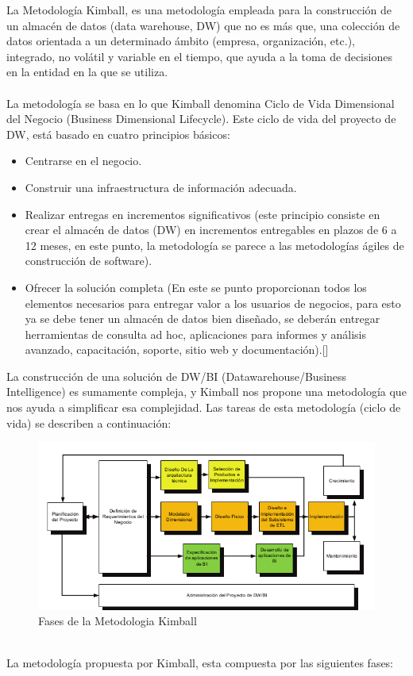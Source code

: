 \documentclass[11pt,a4paper]{article}
\begin{document}
		La Metodología Kimball, es una metodología empleada para la construcción de un almacén de datos (data warehouse, DW) que no es más que, una colección de datos orientada a un determinado ámbito (empresa, organización, etc.), integrado, no volátil y variable en el tiempo, que ayuda a la toma de decisiones en la entidad en la que se utiliza.\\
		\\
		La metodología se basa en lo que Kimball denomina Ciclo de Vida Dimensional del Negocio (Business Dimensional Lifecycle). Este ciclo de vida del proyecto de DW, está basado en cuatro principios básicos:
		\begin{itemize}
			\item Centrarse en el negocio.
			
			\item Construir una infraestructura de información adecuada.
			
			\item Realizar entregas en incrementos significativos (este principio consiste en crear el almacén de datos (DW) en incrementos entregables en plazos de 6 a 12 meses, en este punto, la metodología se parece a las metodologías ágiles de construcción de software).
			
			\item Ofrecer la solución completa (En este se punto proporcionan todos los elementos necesarios para entregar valor a los usuarios de negocios, para esto ya se debe tener un almacén de datos bien diseñado, se deberán entregar herramientas de consulta ad hoc, aplicaciones para informes y análisis avanzado, capacitación, soporte, sitio web y documentación).[\cite{metodKimball1}]
		\end{itemize}
		
		La construcción de una solución de DW/BI (Datawarehouse/Business Intelligence) es sumamente compleja, y Kimball nos propone una metodología que nos ayuda a simplificar esa complejidad. Las tareas de esta metodología (ciclo de vida) se describen a continuación:\\
		\begin{figure}[!ht]
			\begin{center}
				\includegraphics[scale=0.8]{./Imagenes/img05}	
				\caption{Fases de la Metodologia Kimball}		
			\end{center}
		\end{figure}
		\\
		La metodología propuesta por Kimball, esta compuesta por las siguientes fases:
		
\end{document}
